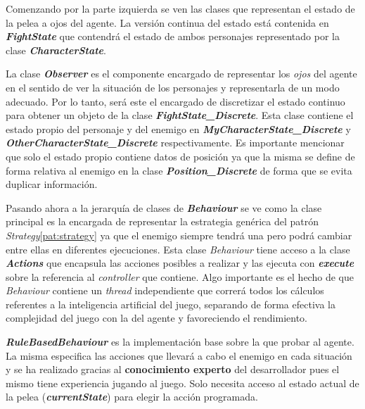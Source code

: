 \bigskip

Comenzando por la parte izquierda se ven las clases que representan el estado de la pelea a ojos del agente. La versión continua del estado está contenida en \textbf{\textit{FightState}} que contendrá el estado de ambos personajes representado por la clase \textbf{\textit{CharacterState}}.

\bigskip
La clase \textbf{\textit{Observer}} es el componente encargado de representar los \textit{ojos} del agente en el sentido de ver la situación de los personajes y representarla de un modo adecuado. Por lo tanto, será este el encargado de discretizar el estado continuo para obtener un objeto de la clase \textbf{\textit{FightState\_Discrete}}. Esta clase contiene el estado propio del personaje y del enemigo en \textbf{\textit{MyCharacterState\_Discrete}} y \textbf{\textit{OtherCharacterState\_Discrete}} respectivamente. Es importante mencionar que solo el estado propio contiene datos de posición ya que la misma se define de forma relativa al enemigo en la clase \textbf{\textit{Position\_Discrete}} de forma que se evita duplicar información.

\bigskip

Pasando ahora a la jerarquía de clases de \textbf{\textit{Behaviour}} se ve como la clase principal es la encargada de representar la estrategia genérica del patrón \textit{Strategy}\ref{pat:strategy} ya que el enemigo siempre tendrá una pero podrá cambiar entre ellas en diferentes ejecuciones. Esta clase \textit{Behaviour} tiene acceso a la clase \textbf{\textit{Actions}} que encapsula las acciones posibles a realizar y las ejecuta con \textbf{\textit{execute}} sobre la referencia al \textit{controller} que contiene. Algo importante es el hecho de que \textit{Behaviour} contiene un \textit{thread} independiente que correrá todos los cálculos referentes a la inteligencia artificial del juego, separando de forma efectiva la complejidad del juego con la del agente y favoreciendo el rendimiento.

\bigskip

\textbf{\textit{RuleBasedBehaviour}} es la implementación base sobre la que probar al agente. La misma especifica las acciones que llevará a cabo el enemigo en cada situación y se ha realizado gracias al \textbf{conocimiento experto} del desarrollador pues el mismo tiene experiencia jugando al juego. Solo necesita acceso al estado actual de la pelea (\textbf{\textit{currentState}}) para elegir la acción programada.

\bigskip

